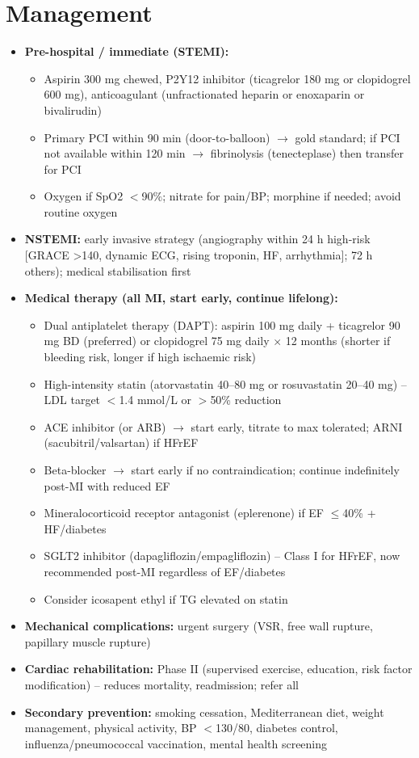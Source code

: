 \section*{Management}
\begin{itemize}
    \item \textbf{Pre-hospital / immediate (STEMI):}
    \begin{itemize}
        \item Aspirin 300 mg chewed, P2Y12 inhibitor (ticagrelor 180 mg or clopidogrel 600 mg), anticoagulant (unfractionated heparin or enoxaparin or bivalirudin)
        \item Primary PCI within 90 min (door-to-balloon) $\to$ gold standard; if PCI not available within 120 min $\to$ fibrinolysis (tenecteplase) then transfer for PCI
        \item Oxygen if SpO2 $<$90\%; nitrate for pain/BP; morphine if needed; avoid routine oxygen
    \end{itemize}
    \item \textbf{NSTEMI:} early invasive strategy (angiography within 24 h high-risk [GRACE >140, dynamic ECG, rising troponin, HF, arrhythmia]; 72 h others); medical stabilisation first
    \item \textbf{Medical therapy (all MI, start early, continue lifelong):}
    \begin{itemize}
        \item Dual antiplatelet therapy (DAPT): aspirin 100 mg daily + ticagrelor 90 mg BD (preferred) or clopidogrel 75 mg daily $\times$ 12 months (shorter if bleeding risk, longer if high ischaemic risk)
        \item High-intensity statin (atorvastatin 40--80 mg or rosuvastatin 20--40 mg) -- LDL target $<$1.4 mmol/L or $>$50\% reduction
        \item ACE inhibitor (or ARB) $\to$ start early, titrate to max tolerated; ARNI (sacubitril/valsartan) if HFrEF
        \item Beta-blocker $\to$ start early if no contraindication; continue indefinitely post-MI with reduced EF
        \item Mineralocorticoid receptor antagonist (eplerenone) if EF $\le$40\% + HF/diabetes
        \item SGLT2 inhibitor (dapagliflozin/empagliflozin) -- Class I for HFrEF, now recommended post-MI regardless of EF/diabetes
        \item Consider icosapent ethyl if TG elevated on statin
    \end{itemize}
    \item \textbf{Mechanical complications:} urgent surgery (VSR, free wall rupture, papillary muscle rupture)
    \item \textbf{Cardiac rehabilitation:} Phase II (supervised exercise, education, risk factor modification) -- reduces mortality, readmission; refer all
    \item \textbf{Secondary prevention:} smoking cessation, Mediterranean diet, weight management, physical activity, BP $<$130/80, diabetes control, influenza/pneumococcal vaccination, mental health screening
\end{itemize}

